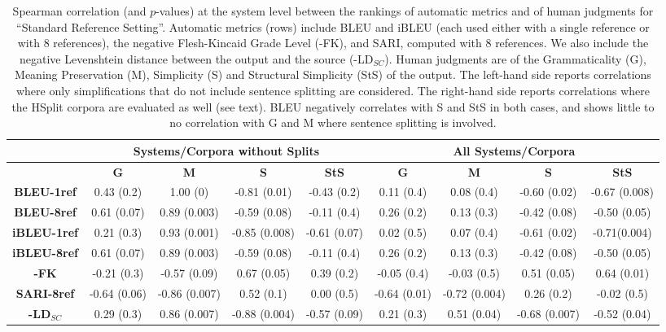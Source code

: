\documentclass[11pt,a4paper]{article}
\begin{document}

\begin{center}
\begin{table*}[ht]
\scriptsize
\centering
\begin{tabular}{|c|c|c|c|c||c|c|c|c|}
\hline
& \multicolumn{4}{|c||}{{\bf Systems/Corpora without Splits}} & \multicolumn{4}{|c|}{{\bf All Systems/Corpora}}\\
\hline
&{\bf G} & {\bf M} & {\bf S} & {\bf StS} &{\bf G} & {\bf M} & {\bf S} & {\bf StS} \\
\hline
{\bf BLEU-1ref}& 0.43 (0.2) & 1.00 (0) & -0.81 (0.01) & -0.43 (0.2) & 0.11 (0.4) & 0.08 (0.4) & -0.60 (0.02) & -0.67 (0.008)  \\
\hline   
{\bf BLEU-8ref} & 0.61 (0.07) & 0.89 (0.003) & -0.59 (0.08) & -0.11 (0.4) & 0.26 (0.2) & 0.13 (0.3) & -0.42 (0.08) & -0.50 (0.05)\\
\hline
{\bf iBLEU-1ref} & 0.21 (0.3) & 0.93 (0.001) & -0.85 (0.008) & -0.61 (0.07) & 0.02 (0.5) & 0.07 (0.4) & -0.61 (0.02) & -0.71(0.004) \\
\hline     
{\bf iBLEU-8ref} &0.61 (0.07)& 0.89 (0.003) & -0.59 (0.08) & -0.11 (0.4) & 0.26 (0.2) & 0.13 (0.3) & -0.42 (0.08)& -0.50 (0.05) \\
\hline
{\bf -FK} & -0.21 (0.3) & -0.57 (0.09) & 0.67 (0.05)& 0.39 (0.2) & -0.05 (0.4) & -0.03 (0.5) & 0.51 (0.05)& 0.64 (0.01) \\
\hline
 {\bf SARI-8ref} & -0.64 (0.06)& -0.86 (0.007) & 0.52 (0.1)& 0.00 (0.5) & -0.64 (0.01)& -0.72 (0.004) & 0.26 (0.2)& -0.02 (0.5)\\
\hline \hline
{\bf -LD$_{SC}$} & 0.29 (0.3)& 0.86 (0.007)  & -0.88 (0.004) & -0.57 (0.09)& 0.21 (0.3)& 0.51 (0.04)& -0.68 (0.007) & -0.52 (0.04)\\
\hline   
\end{tabular}
\hfill
\caption{\small Spearman correlation (and $p$-values) at the system level between the rankings of automatic metrics and of human judgments for ``Standard Reference Setting''.
Automatic metrics (rows) include BLEU and iBLEU (each used either with a single reference or with 8 references), the negative Flesh-Kincaid Grade Level (-FK), and SARI, computed with 8 references. We also include the negative Levenshtein distance between the output and the source (-LD$_{SC}$). Human judgments are of the Grammaticality (G), Meaning Preservation (M), Simplicity (S) and Structural Simplicity (StS) of the output.
  The left-hand side reports correlations where only simplifications that do not include sentence splitting are considered. The right-hand side reports correlations where the HSplit 
  corpora are evaluated as well (see text).
  BLEU negatively correlates with S and StS in both cases, and shows little to no correlation with G and M where sentence splitting is involved.
}
\label{tab:correlation}
\end{table*}
\end{center}
\end{document}
